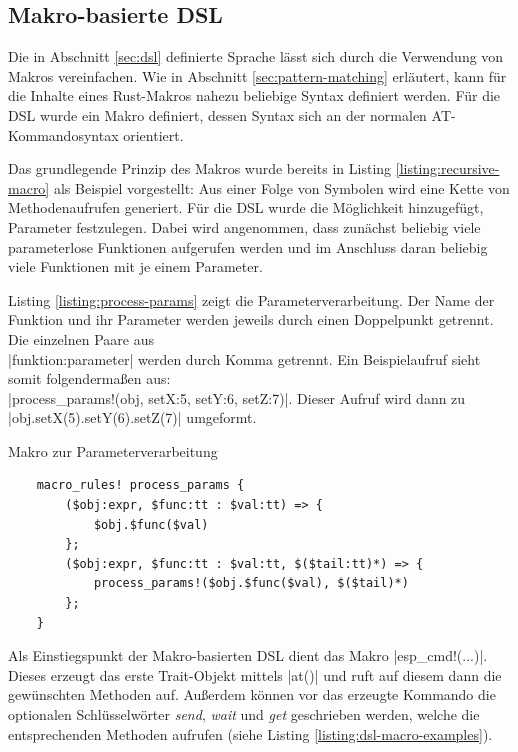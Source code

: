 \documentclass
[ 12pt,
  parskip=half %
]{scrreprt}
\newenvironment{mylisting}[1][H]
{\captionsetup{aboveskip=-0.2\normalbaselineskip}\begin{listing}[#1]}
{\end{listing}}
\begin{document}
\subsection{Makro-basierte DSL}

Die in Abschnitt \ref{sec:dsl} definierte Sprache lässt sich durch die Verwendung von Makros vereinfachen. Wie in Abschnitt \ref{sec:pattern-matching} erläutert, kann für die Inhalte eines Rust-Makros nahezu beliebige Syntax definiert werden. Für die DSL wurde ein Makro definiert, dessen Syntax sich an der normalen AT-Kommandosyntax orientiert. 

Das grundlegende Prinzip des Makros wurde bereits in Listing \ref{listing:recursive-macro} als Beispiel vorgestellt: Aus einer Folge von Symbolen wird eine Kette von Methodenaufrufen generiert. Für die DSL wurde die Möglichkeit hinzugefügt, Parameter festzulegen. Dabei wird angenommen, dass zunächst beliebig viele parameterlose Funktionen aufgerufen werden und im Anschluss daran beliebig viele Funktionen mit je einem Parameter.

Listing \ref{listing:process-params} zeigt die Parameterverarbeitung. Der Name der Funktion und ihr Parameter werden jeweils durch einen Doppelpunkt getrennt. Die einzelnen Paare aus \\ \textinline|funktion:parameter| werden durch Komma getrennt. Ein Beispielaufruf sieht somit folgendermaßen aus: \\ \rustinline|process_params!(obj, setX:5, setY:6, setZ:7)|.
Dieser Aufruf wird dann zu \\ \rustinline|obj.setX(5).setY(6).setZ(7)| umgeformt.

\begin{mylisting}
	\caption{Makro zur Parameterverarbeitung}
	\label{listing:process-params}
	\begin{verbatim}
	macro_rules! process_params {
		($obj:expr, $func:tt : $val:tt) => { 
			$obj.$func($val)
		};
		($obj:expr, $func:tt : $val:tt, $($tail:tt)*) => {
			process_params!($obj.$func($val), $($tail)*)
		};
	}
	\end{verbatim}
\end{mylisting} 

Als Einstiegspunkt der Makro-basierten DSL dient das Makro \rustinline|esp_cmd!(...)|. Dieses erzeugt das erste Trait-Objekt mittels \rustinline|at()| und ruft auf diesem dann die gewünschten Methoden auf. Außerdem können vor das erzeugte Kommando die optionalen Schlüsselwörter \textit{send}, \textit{wait} und \textit{get} geschrieben werden, welche die entsprechenden Methoden aufrufen (siehe Listing \ref{listing:dsl-macro-examples}). 
\end{document}
